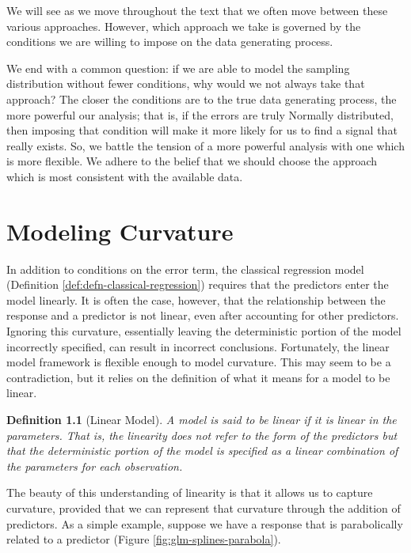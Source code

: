\documentclass[
]{book}
\theoremstyle{plain}
\theoremstyle{mydefn}
\newtheorem{definition}{Definition}[chapter]
\theoremstyle{myexmpl}
\theoremstyle{remark}
\begin{document}
We will see as we move throughout the text that we often move between these various approaches. However, which approach we take is governed by the conditions we are willing to impose on the data generating process.

We end with a common question: if we are able to model the sampling distribution without fewer conditions, why would we not always take that approach? The closer the conditions are to the true data generating process, the more powerful our analysis; that is, if the errors are truly Normally distributed, then imposing that condition will make it more likely for us to find a signal that really exists. So, we battle the tension of a more powerful analysis with one which is more flexible. We adhere to the belief that we should choose the approach which is most consistent with the available data.

\hypertarget{glm-splines}{%
\chapter{Modeling Curvature}\label{glm-splines}}

In addition to conditions on the error term, the classical regression model (Definition \ref{def:defn-classical-regression}) requires that the predictors enter the model linearly. It is often the case, however, that the relationship between the response and a predictor is not linear, even after accounting for other predictors. Ignoring this curvature, essentially leaving the deterministic portion of the model incorrectly specified, can result in incorrect conclusions. Fortunately, the linear model framework is flexible enough to model curvature. This may seem to be a contradiction, but it relies on the definition of what it means for a model to be linear.

\begin{definition}[Linear Model]
\protect\hypertarget{def:defn-linear-model}{}{\label{def:defn-linear-model} {} }A model is said to be linear if it is linear in the \emph{parameters}. That is, the linearity does not refer to the form of the predictors but that the deterministic portion of the model is specified as a linear combination of the parameters for each observation.
\end{definition}

The beauty of this understanding of linearity is that it allows us to capture curvature, provided that we can represent that curvature through the addition of predictors. As a simple example, suppose we have a response that is parabolically related to a predictor (Figure \ref{fig:glm-splines-parabola}).
\end{document}
